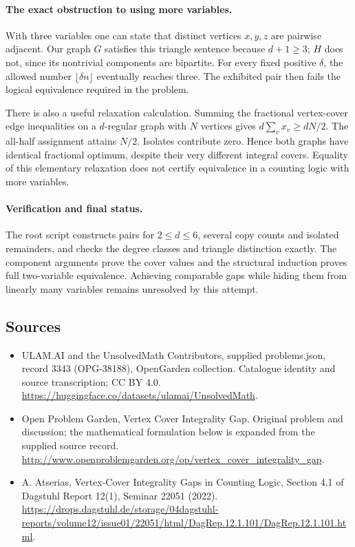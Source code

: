 \documentclass[11pt,a4paper]{article}
\begin{document}
\paragraph{The exact obstruction to using more variables.}
With three variables one can state that distinct
vertices $x,y,z$ are pairwise adjacent. Our graph $G$
satisfies this triangle sentence because $d+1\ge3$;
$H$ does not, since its nontrivial components are
bipartite. For every fixed positive $\delta$, the
allowed number $\lfloor\delta n\rfloor$ eventually
reaches three. The exhibited pair then fails the
logical equivalence required in the problem.

There is also a useful relaxation calculation. Summing
the fractional vertex-cover edge inequalities on a
$d$-regular graph with $N$ vertices gives
$d\sum_v x_v\ge dN/2$. The all-half assignment
attains $N/2$. Isolates contribute zero. Hence both
graphs have identical fractional optimum, despite
their very different integral covers. Equality of
this elementary relaxation does not certify equivalence
in a counting logic with more variables.

\paragraph{Verification and final status.}
The root script constructs pairs for $2\le d\le6$,
several copy counts and isolated remainders, and checks
the degree classes and triangle distinction exactly.
The component arguments prove the cover values and
the structural induction proves full two-variable
equivalence. Achieving comparable gaps while hiding
them from linearly many variables remains unresolved
by this attempt.

\subsection{Sources}
\begin{itemize}
\item[S1] ULAM.AI and the UnsolvedMath Contributors, supplied problems.json, record 3343 (OPG-38188), OpenGarden collection. Catalogue identity and source transcription; CC BY 4.0.
\url{https://huggingface.co/datasets/ulamai/UnsolvedMath}.
\item[S2] Open Problem Garden, Vertex Cover Integrality Gap. Original problem and discussion; the mathematical formulation below is expanded from the supplied source record.
\url{http://www.openproblemgarden.org/op/vertex_cover_integrality_gap}.

\item[R1] A. Atserias, Vertex-Cover Integrality Gaps in Counting Logic,
Section 4.1 of Dagstuhl Report 12(1), Seminar 22051 (2022).
\url{https://drops.dagstuhl.de/storage/04dagstuhl-reports/volume12/issue01/22051/html/DagRep.12.1.101/DagRep.12.1.101.html}.

\end{itemize}
\end{document}
